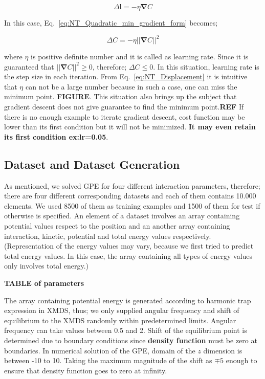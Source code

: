 \documentclass[a4paper,times,12pt]{article}
\begin{document}
\begin{equation}
\label{eq:NT_learning_rate}
\Delta{\boldsymbol{l}} = -\eta\boldsymbol{\nabla}C
\end{equation}

In this case, Eq.~\ref{eq:NT_Quadratic_min_gradient_form} becomes;

\begin{equation}
\label{eq:NT_Displacement}
\Delta{C} = -\eta ||\boldsymbol{\nabla}{C}||^2
\end{equation}

where $\eta$ is positive definite number and it is called as learning rate. Since it is guaranteed that $||\boldsymbol{\nabla}{C}||^2 \geq 0$, therefore; $\Delta{C} \leq 0$. In this situation, learning rate is the step size in each iteration. From Eq.~\ref{eq:NT_Displacement} it is intuitive that $\eta$ can not be a large number because in such a case, one can miss the minimum point. \textbf{FIGURE}. This situation also brings up the subject that gradient descent does not give guarantee to find the minimum point.{\textbf{REF}} If there is no enough example to iterate gradient descent, cost function may be lower than its first condition but it will not be minimized. \textbf{It may even retain its first condition ex:lr=0.05}. 

\subsection{Dataset and Dataset Generation}

As mentioned, we solved GPE for four different interaction parameters, therefore; there are four different corresponding datasets and each of them contains 10.000 elements. We used 8500 of them as training examples and 1500 of them for test if otherwise is specified. An element of a dataset involves an array containing potential values respect to the position and an another array containing interaction, kinetic, potential and total energy values respectively. (Representation of the energy values may vary, because we first tried to predict total energy values. In this case, the array containing all types of energy values only involves total energy.)

\textbf{TABLE of parameters}

The array containing potential energy is generated according to harmonic trap expression in XMDS, thus; we only supplied angular frequency and shift of equilibrium to the XMDS randomly within predetermined limits. Angular frequency can take values between 0.5 and 2. Shift of the equilibrium point is determined due to boundary conditions since \textbf{density function} must be zero at boundaries. In numerical solution of the GPE, domain of the $z$ dimension is between -10 to 10. Taking the maximum magnitude of the shift as $\mp 5$ enough to ensure that density function goes to zero at infinity.
\end{document}

